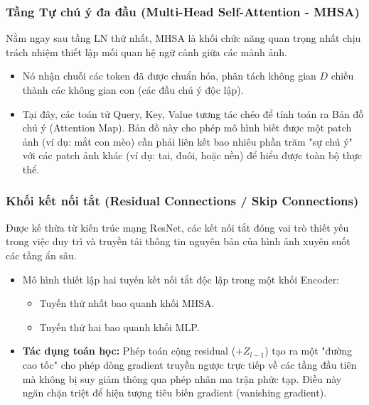 \subsubsection{Tầng Tự chú ý đa đầu (Multi-Head Self-Attention - MHSA)}
Nằm ngay sau tầng LN thứ nhất, MHSA là khối chức năng quan trọng nhất chịu trách nhiệm thiết lập mối quan hệ ngữ cảnh giữa các mảnh ảnh.
\begin{itemize}
    \item Nó nhận chuỗi các token đã được chuẩn hóa, phân tách không gian $D$ chiều thành các không gian con (các đầu chú ý độc lập).
    \item Tại đây, các toán tử Query, Key, Value tương tác chéo để tính toán ra Bản đồ chú ý (Attention Map). Bản đồ này cho phép mô hình biết được một patch ảnh (ví dụ: mắt con mèo) cần phải liên kết bao nhiêu phần trăm "sự chú ý" với các patch ảnh khác (ví dụ: tai, đuôi, hoặc nền) để hiểu được toàn bộ thực thể.
\end{itemize}
\subsubsection{Khối kết nối tắt (Residual Connections / Skip Connections)}
Được kế thừa từ kiến trúc mạng ResNet, các kết nối tắt đóng vai trò thiết yếu trong việc duy trì và truyền tải thông tin nguyên bản của hình ảnh xuyên suốt các tầng ẩn sâu.
\begin{itemize}
    \item Mô hình thiết lập hai tuyến kết nối tắt độc lập trong một khối Encoder:
    \begin{itemize}
        \item Tuyến thứ nhất bao quanh khối MHSA.
        \item Tuyến thứ hai bao quanh khối MLP.
    \end{itemize}
    \item \textbf{Tác dụng toán học:} Phép toán cộng residual ($+ Z_{l-1}$) tạo ra một "đường cao tốc" cho phép dòng gradient truyền ngược trực tiếp về các tầng đầu tiên mà không bị suy giảm thông qua phép nhân ma trận phức tạp. Điều này ngăn chặn triệt để hiện tượng tiêu biến gradient (vanishing gradient).
\end{itemize}
